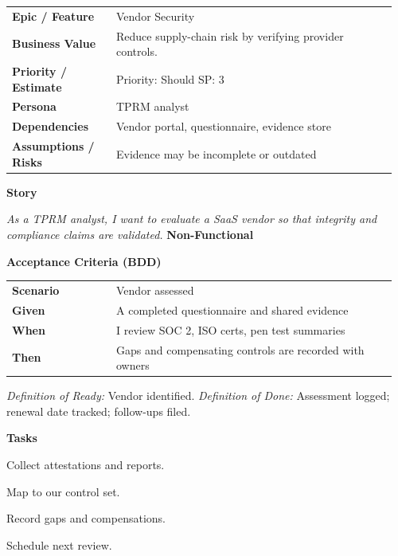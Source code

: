 \documentclass[11pt,letterpaper]{article}
\makeatletter
\newenvironment{kvtable}{%
  \begin{tabular}{@{}>{\bfseries\arraybackslash}p{0.26\linewidth} p{0.70\linewidth}@{}}
}{\end{tabular}}
\newenvironment{bdd}{%
  \begin{tabular}{@{}>{\bfseries\arraybackslash}p{0.26\linewidth} p{0.70\linewidth}@{}}
}{\end{tabular}}
\newcommand{\DoRDoD}[2]{%
  \vspace{0.35em}
  {\footnotesize\color{Muted}%
    \textit{Definition of Ready:} #1 \; \textbullet\;
    \textit{Definition of Done:} #2%
  }%
}
\newenvironment{storycard}[2]{%
  \begin{tcolorbox}[cloudcard, title={#1 --- #2}]%
}{\end{tcolorbox}}
\newcommand{\sectionlabel}[1]{\vspace{0.35em}\textbf{#1}\par}
\makeatother
\begin{document}
\begin{storycard}{CCS-18}{Ch. 18 — Third-Party Provider Integrity}
\begin{kvtable}
Epic / Feature & Vendor Security\\
Business Value & Reduce supply-chain risk by verifying provider controls.\\
Priority / Estimate & Priority: Should \quad SP: 3\\
Persona & TPRM analyst\\
Dependencies & Vendor portal, questionnaire, evidence store\\
Assumptions / Risks & Evidence may be incomplete or outdated\\
\end{kvtable}
\sectionlabel{Story}
\textit{As a TPRM analyst, I want to evaluate a SaaS vendor so that integrity and compliance claims are validated.}
\sectionlabel{Non-Functional}\;
\sectionlabel{Acceptance Criteria (BDD)}
\begin{bdd}
Scenario & Vendor assessed\\
Given & A completed questionnaire and shared evidence\\
When & I review SOC 2, ISO certs, pen test summaries\\
Then & Gaps and compensating controls are recorded with owners\\
\end{bdd}
\DoRDoD{Vendor identified.}{Assessment logged; renewal date tracked; follow-ups filed.}
\sectionlabel{Tasks}
\begin{checklist}
\item Collect attestations and reports.
\item Map to our control set.
\item Record gaps and compensations.
\item Schedule next review.
\end{checklist}
\end{storycard}
\end{document}

